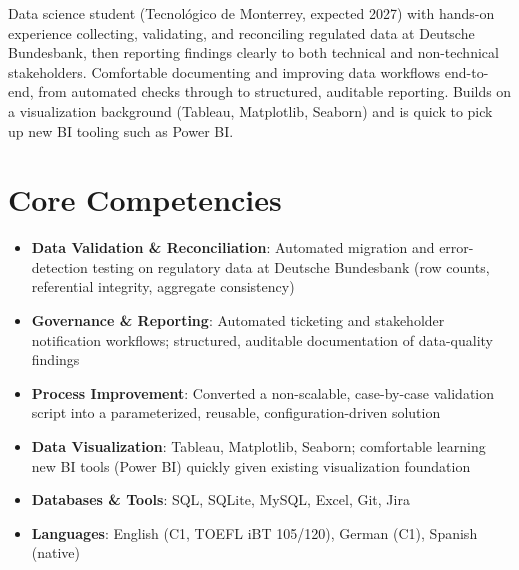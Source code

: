 \documentclass[11pt,a4paper,sans]{moderncv}
\begin{document}
\makecvtitle


\vspace{6pt}
\small{Data science student (Tecnológico de Monterrey, expected 2027) with hands-on experience collecting, validating, and reconciling regulated data at Deutsche Bundesbank, then reporting findings clearly to both technical and non-technical stakeholders. Comfortable documenting and improving data workflows end-to-end, from automated checks through to structured, auditable reporting. Builds on a visualization background (Tableau, Matplotlib, Seaborn) and is quick to pick up new BI tooling such as Power BI.}


\section{Core Competencies}
\vspace{1pt}
\begin{itemize}

\item \textbf{Data Validation \& Reconciliation}: Automated migration and error-detection testing on regulatory data at Deutsche Bundesbank (row counts, referential integrity, aggregate consistency)

\item \textbf{Governance \& Reporting}: Automated ticketing and stakeholder notification workflows; structured, auditable documentation of data-quality findings

\item \textbf{Process Improvement}: Converted a non-scalable, case-by-case validation script into a parameterized, reusable, configuration-driven solution

\item \textbf{Data Visualization}: Tableau, Matplotlib, Seaborn; comfortable learning new BI tools (Power BI) quickly given existing visualization foundation

\item \textbf{Databases \& Tools}: SQL, SQLite, MySQL, Excel, Git, Jira

\item \textbf{Languages}: English (C1, TOEFL iBT 105/120), German (C1), Spanish (native)

\end{itemize}
\end{document}
